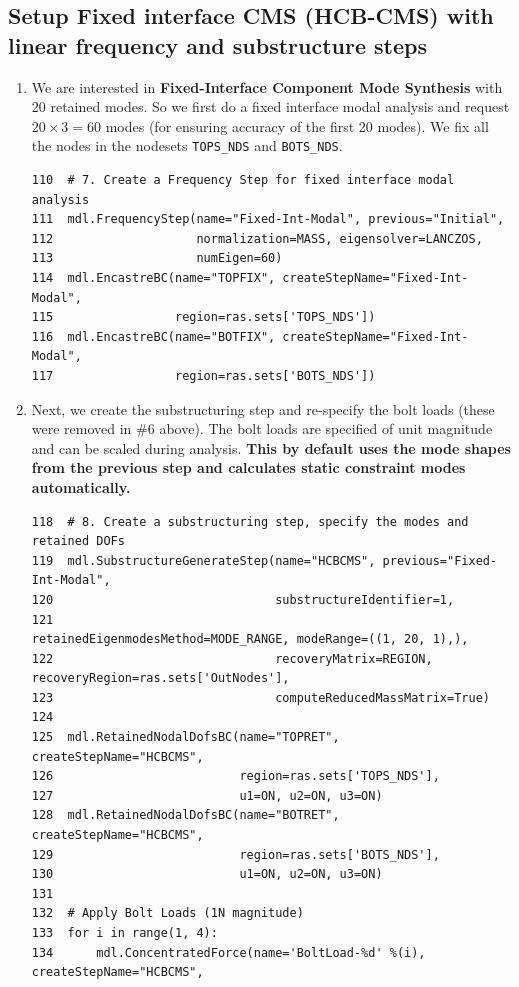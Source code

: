 \documentclass[11pt]{article}
\begin{document}
\subsection{Setup Fixed interface CMS (HCB-CMS) with linear frequency and substructure steps}
\label{sec:orgc7e3fc1}
\begin{enumerate}
\item We are interested in \textbf{Fixed-Interface Component Mode Synthesis} with 20 retained modes.
So we first do a fixed interface modal analysis and request \(20\times3 = 60\) modes (for ensuring accuracy of the first 20 modes).
We fix all the nodes in the nodesets \texttt{TOPS\_NDS} and \texttt{BOTS\_NDS}.
\begin{verbatim}
110  # 7. Create a Frequency Step for fixed interface modal analysis
111  mdl.FrequencyStep(name="Fixed-Int-Modal", previous="Initial",
112                    normalization=MASS, eigensolver=LANCZOS,
113                    numEigen=60)
114  mdl.EncastreBC(name="TOPFIX", createStepName="Fixed-Int-Modal",
115                 region=ras.sets['TOPS_NDS'])
116  mdl.EncastreBC(name="BOTFIX", createStepName="Fixed-Int-Modal",
117                 region=ras.sets['BOTS_NDS'])
\end{verbatim}
\item Next, we create the substructuring step and re-specify the bolt loads (these were removed in \#6 above).
The bolt loads are specified of unit magnitude and can be scaled during analysis.
\textbf{This by default uses the mode shapes from the previous step and calculates static constraint modes automatically.}
\begin{verbatim}
118  # 8. Create a substructuring step, specify the modes and retained DOFs
119  mdl.SubstructureGenerateStep(name="HCBCMS", previous="Fixed-Int-Modal",
120                               substructureIdentifier=1, 
121                               retainedEigenmodesMethod=MODE_RANGE, modeRange=((1, 20, 1),),
122                               recoveryMatrix=REGION, recoveryRegion=ras.sets['OutNodes'],
123                               computeReducedMassMatrix=True)
124  
125  mdl.RetainedNodalDofsBC(name="TOPRET", createStepName="HCBCMS", 
126                          region=ras.sets['TOPS_NDS'], 
127                          u1=ON, u2=ON, u3=ON)
128  mdl.RetainedNodalDofsBC(name="BOTRET", createStepName="HCBCMS", 
129                          region=ras.sets['BOTS_NDS'], 
130                          u1=ON, u2=ON, u3=ON)
131  
132  # Apply Bolt Loads (1N magnitude)
133  for i in range(1, 4):
134      mdl.ConcentratedForce(name='BoltLoad-%d' %(i), createStepName="HCBCMS",

\end{verbatim}
\end{enumerate}
\end{document}
